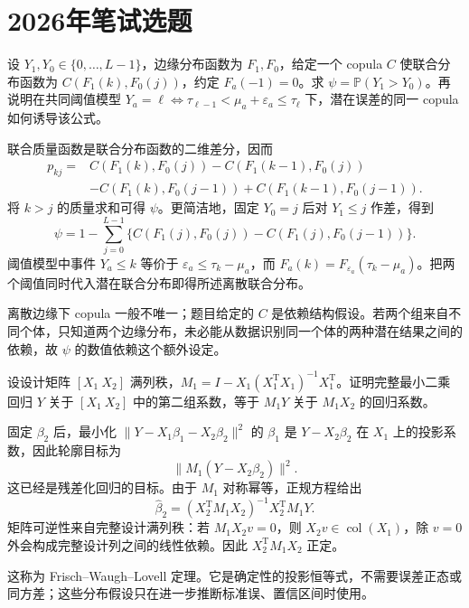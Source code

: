 \documentclass[UTF8,12pt,a4paper,fontset=fandol]{ctexbook}
\newcommand{\PP}{\mathbb P}
\begin{document}
\section{2026年笔试选题}
\begin{example}[原题1：序数变量的联合分布与优胜概率]\label{yau:2026-1}
设 $Y_1,Y_0\in\{0,\ldots,L-1\}$，边缘分布函数为 $F_1,F_0$，给定一个 copula $C$ 使联合分布函数为 $C(F_1(k),F_0(j))$，约定 $F_a(-1)=0$。求 $\psi=\PP(Y_1>Y_0)$。再说明在共同阈值模型 $Y_a=\ell\Leftrightarrow\tau_{\ell-1}<\mu_a+\varepsilon_a\le\tau_\ell$ 下，潜在误差的同一 copula 如何诱导该公式。
\end{example}
\begin{solve}
联合质量函数是联合分布函数的二维差分，因而
\[
\begin{aligned}
p_{kj}={}&C(F_1(k),F_0(j))-C(F_1(k-1),F_0(j))\\
&-C(F_1(k),F_0(j-1))+C(F_1(k-1),F_0(j-1)).
\end{aligned}
\]
将 $k>j$ 的质量求和可得 $\psi$。更简洁地，固定 $Y_0=j$ 后对 $Y_1\le j$ 作差，得到
\[
\psi=1-\sum_{j=0}^{L-1}\{C(F_1(j),F_0(j))-C(F_1(j),F_0(j-1))\}.
\]
阈值模型中事件 $Y_a\le k$ 等价于 $\varepsilon_a\le\tau_k-\mu_a$，而 $F_a(k)=F_{\varepsilon_a}(\tau_k-\mu_a)$。把两个阈值同时代入潜在联合分布即得所述离散联合分布。

离散边缘下 copula 一般不唯一；题目给定的 $C$ 是依赖结构假设。若两个组来自不同个体，只知道两个边缘分布，未必能从数据识别同一个体的两种潜在结果之间的依赖，故 $\psi$ 的数值依赖这个额外设定。
\end{solve}

\begin{example}[原题2：分块回归与残差化定理]\label{yau:2026-2}
设设计矩阵 $[X_1\ X_2]$ 满列秩，$M_1=I-X_1(X_1^{\mathrm T}X_1)^{-1}X_1^{\mathrm T}$。证明完整最小二乘回归 $Y$ 关于 $[X_1\ X_2]$ 中的第二组系数，等于 $M_1Y$ 关于 $M_1X_2$ 的回归系数。
\end{example}
\begin{solve}
固定 $\beta_2$ 后，最小化 $\|Y-X_1\beta_1-X_2\beta_2\|^2$ 的 $\beta_1$ 是 $Y-X_2\beta_2$ 在 $X_1$ 上的投影系数，因此轮廓目标为
\[
\|M_1(Y-X_2\beta_2)\|^2.
\]
这已经是残差化回归的目标。由于 $M_1$ 对称幂等，正规方程给出
\[
\widehat\beta_2=(X_2^{\mathrm T}M_1X_2)^{-1}X_2^{\mathrm T}M_1Y.
\]
矩阵可逆性来自完整设计满列秩：若 $M_1X_2v=0$，则 $X_2v\in\operatorname{col}(X_1)$，除 $v=0$ 外会构成完整设计列之间的线性依赖。因此 $X_2^{\mathrm T}M_1X_2$ 正定。

这称为 Frisch--Waugh--Lovell 定理。它是确定性的投影恒等式，不需要误差正态或同方差；这些分布假设只在进一步推断标准误、置信区间时使用。
\end{solve}
\end{document}
